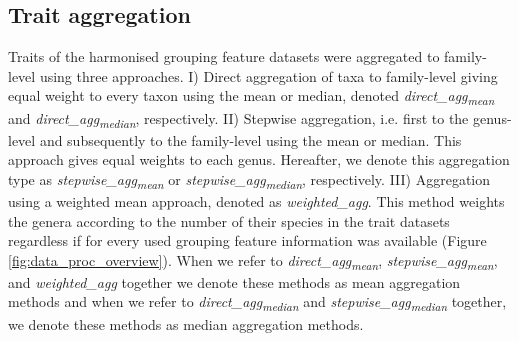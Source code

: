 \documentclass{article}
\begin{document}

\subsection*{Trait aggregation}

Traits of the harmonised grouping feature datasets were aggregated to family-level using three approaches. I) Direct aggregation of taxa to family-level giving equal weight to every taxon using the mean or median, denoted \textit{direct\_agg\textsubscript{mean}} and \textit{direct\_agg\textsubscript{median}}, respectively. II) Stepwise aggregation, i.e. first to the genus-level and subsequently to the family-level using the mean or median. This approach gives equal weights to each genus. Hereafter, we denote this aggregation type as \textit{stepwise\_agg\textsubscript{mean}} or \textit{stepwise\_agg\textsubscript{median}}, respectively. III) Aggregation using a weighted mean approach, denoted as \textit{weighted\_agg}. This method weights the genera according to the number of their species in the trait datasets regardless if for every used grouping feature information was available (Figure \ref{fig:data_proc_overview}). When we refer to \textit{direct\_agg\textsubscript{mean}}, \textit{stepwise\_agg\textsubscript{mean}}, and \textit{weighted\_agg} together we denote these methods as mean aggregation methods and when we refer to \textit{direct\_agg\textsubscript{median}} and \textit{stepwise\_agg\textsubscript{median}} together, we denote these methods as median aggregation methods.
\end{document}
